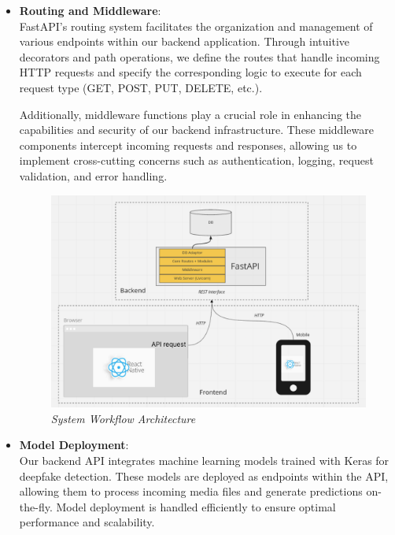 \begin{itemize}
    \item \textbf{Routing and Middleware}:\\
          FastAPI's routing system facilitates the organization and management of various endpoints within our backend application. Through intuitive decorators and path operations, we define the routes that handle incoming HTTP requests and specify the corresponding logic to execute for each request type (GET, POST, PUT, DELETE, etc.).

          Additionally, middleware functions play a crucial role in enhancing the capabilities and security of our backend infrastructure. These middleware components intercept incoming requests and responses, allowing us to implement cross-cutting concerns such as authentication, logging, request validation, and error handling.

          \begin{figure}[htbp]
              \centering
              \includegraphics[width=6in]{img/Frontend_Backend.png}
              \caption{\textit{System Workflow Architecture}}
          \end{figure}

    \item \textbf{Model Deployment}:\\
          Our backend API integrates machine learning models trained with Keras for deepfake detection. These models are deployed as endpoints within the API, allowing them to process incoming media files and generate predictions on-the-fly. Model deployment is handled efficiently to ensure optimal performance and scalability.

\end{itemize}


\newpage
